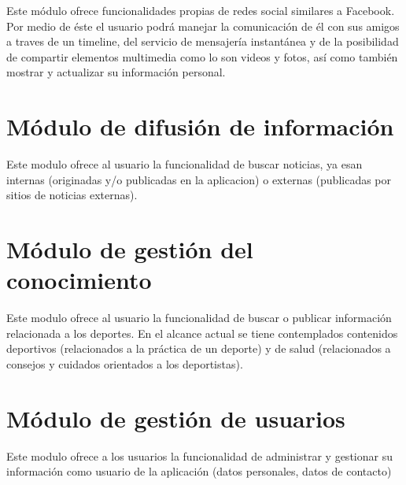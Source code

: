 Este módulo ofrece funcionalidades propias de redes social similares a Facebook. Por medio de éste el usuario podrá manejar la comunicación de él con sus amigos a traves de un timeline, del servicio de mensajería instantánea y de la posibilidad de compartir elementos multimedia como lo son videos y fotos, así como también mostrar y actualizar su información personal.

\section{Módulo de difusión de información}

%

Este modulo ofrece al usuario la funcionalidad de buscar noticias, ya esan internas (originadas y/o publicadas en la aplicacion) o externas (publicadas por sitios de noticias externas).

\section{Módulo de gestión del conocimiento}

%

Este modulo ofrece al usuario la funcionalidad de buscar o publicar información relacionada a los deportes. En el alcance actual se tiene contemplados contenidos deportivos (relacionados a la práctica de un deporte) y de salud (relacionados a consejos y cuidados orientados a los deportistas).

\section{Módulo de gestión de usuarios}

%

Este modulo ofrece a los usuarios la funcionalidad de administrar y gestionar su información como usuario de la aplicación (datos personales, datos de contacto)
